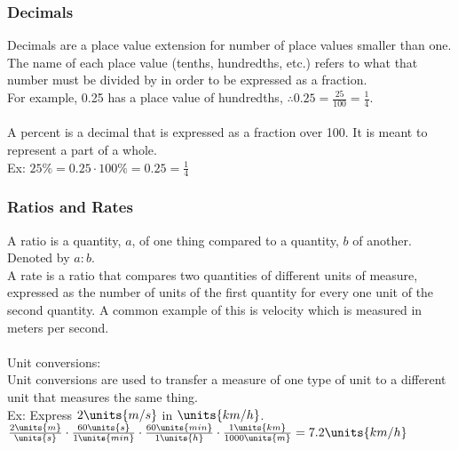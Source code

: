 \subsubsection{Decimals}
Decimals are a place value extension for number of place values smaller than one.\\
The name of each place value (tenths, hundredths, etc.) refers to what that number must be divided by in order to be expressed as a fraction.\\
For example, 0.25 has a place value of hundredths, $\therefore 0.25=\frac{25}{100}=\frac{1}{4}$.\\
\\
A percent is a decimal that is expressed as a fraction over 100. It is meant to represent a part of a whole.\\
Ex: $25\%=0.25\cdot 100\%=0.25=\frac{1}{4}$\\

\subsubsection{Ratios and Rates}
A ratio is a quantity, $a$, of one thing compared to a quantity, $b$ of another. Denoted by $a:b$.\\
A rate is a ratio that compares two quantities of different units of measure, expressed as the number of units of the first quantity for every one unit of the second quantity. A common example of this is velocity which is measured in meters per second.\\
\\
Unit conversions:\\
Unit conversions are used to transfer a measure of one type of unit to a different unit that measures the same thing.\\
Ex: Express $2\units{m/s}$ in $\units{km/h}$.\\
$\frac{2\units{m}}{\units{s}}\cdot\frac{60\units{s}}{1\units{min}}\cdot\frac{60\units{min}}{1\units{h}}\cdot\frac{1\units{km}}{1000\units{m}}=7.2\units{km/h}$